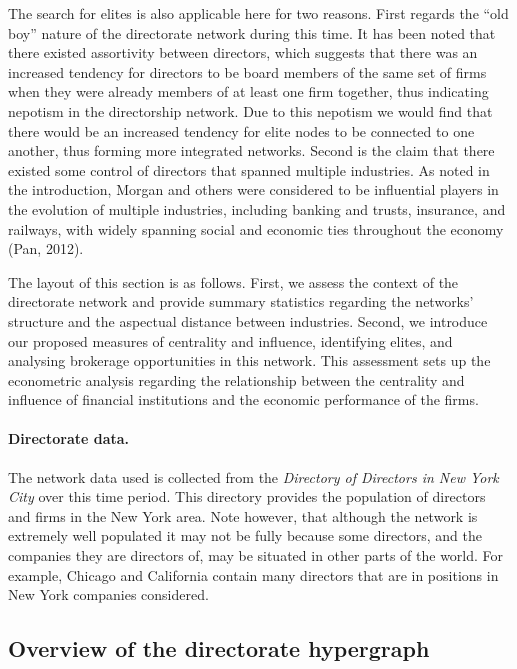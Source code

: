 The search for elites is also applicable here for two reasons. First regards the ``old boy'' nature of the directorate network during this time. It has been noted that there existed assortivity between directors, which suggests that there was an increased tendency for directors to be board members of the same set of firms when they were already members of at least one firm together, thus indicating nepotism in the directorship network. Due to this nepotism we would find that there would be an increased tendency for elite nodes to be connected to one another, thus forming more integrated networks. Second is the claim that there existed some control of directors that spanned multiple industries. As noted in the introduction, Morgan and others were considered to be influential players in the evolution of multiple industries, including banking and trusts, insurance, and railways, with widely spanning social and economic ties throughout the economy (Pan, 2012).

The layout of this section is as follows. First, we assess the context of the directorate network and provide summary statistics regarding the networks' structure and the aspectual distance between industries. Second, we introduce our proposed measures of centrality and influence, identifying elites, and analysing brokerage opportunities in this network. This assessment sets up the econometric analysis regarding the relationship between the centrality and influence of financial institutions and the economic performance of the firms.

\paragraph{Directorate data.}

The network data used is collected from the \emph{Directory of Directors in New York City} over this time period. This directory provides the population of directors and firms in the New York area. Note however, that although the network is extremely well populated it may not be fully because some directors, and the companies they are directors of, may be situated in other parts of the world. For example, Chicago and California contain many directors that are in positions in New York companies considered.

\subsection{Overview of the directorate hypergraph}

